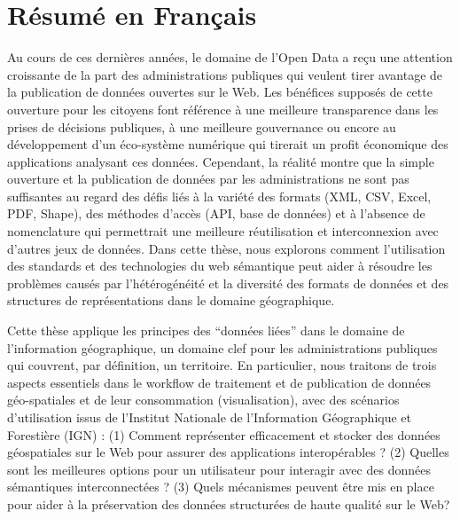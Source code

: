 \chapter{R\'{e}sum\'{e} en Fran\c{c}ais} \label{chap:resume}

Au cours de ces derni\`{e}res ann\'{e}es, le domaine de l'Open Data a re\c{c}u une attention croissante de la part des administrations publiques qui veulent tirer avantage de la publication de donn\'{e}es ouvertes sur le Web. Les b\'{e}n\'{e}fices suppos\'{e}s de cette ouverture pour les citoyens font r\'{e}f\'{e}rence \`{a} une meilleure transparence dans les prises de d\'{e}cisions publiques, \`{a} une meilleure gouvernance ou encore au d\'{e}veloppement d'un \'{e}co-syst\`{e}me num\'{e}rique qui tirerait un profit \'{e}conomique des applications analysant ces donn\'{e}es. Cependant, la r\'{e}alit\'{e} montre que la simple ouverture et la publication de donn\'{e}es par les administrations ne sont pas suffisantes au regard des d\'{e}fis li\'{e}s \`{a} la vari\'{e}t\'{e} des formats (XML, CSV, Excel, PDF, Shape), des m\'{e}thodes d'acc\`{e}s (API, base de donn\'{e}es) et \`{a} l'absence de nomenclature qui permettrait une meilleure r\'{e}utilisation et interconnexion avec d'autres jeux de donn\'{e}es. Dans cette th\`{e}se, nous explorons comment l'utilisation des standards et des technologies du web s\'{e}mantique peut aider \`{a} r\'{e}soudre les probl\`{e}mes caus\'{e}s par l'h\'{e}t\'{e}rog\'{e}n\'{e}it\'{e} et la diversit\'{e} des formats de donn\'{e}es et des structures de repr\'{e}sentations dans le domaine g\'{e}ographique.

Cette th\`{e}se applique les principes des ``donn\'{e}es li\'{e}es'' dans le domaine de l'information g\'{e}ographique, un domaine clef pour les administrations publiques qui couvrent, par d\'{e}finition, un territoire. En particulier, nous traitons de trois aspects essentiels dans le workflow de traitement et de publication de donn\'{e}es g\'{e}o-spatiales et de leur consommation (visualisation), avec des sc\'{e}narios d'utilisation issus de l'Institut Nationale de l'Information G\'{e}ographique et Foresti\`{e}re (IGN) : (1) Comment repr\'{e}senter efficacement et stocker des donn\'{e}es g\'{e}ospatiales sur le Web pour assurer des applications interop\'{e}rables ? (2) Quelles sont les meilleures options pour un utilisateur pour interagir avec des donn\'{e}es s\'{e}mantiques interconnect\'{e}es ? (3) Quels m\'{e}canismes peuvent \^{e}tre mis en place pour aider \`{a} la pr\'{e}servation des donn\'{e}es structur\'{e}es de haute qualit\'{e} sur le Web?

